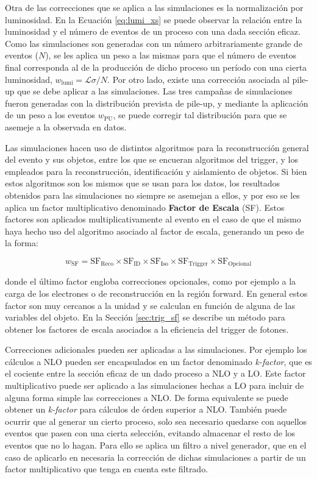 Otra de las correcciones que se aplica a las simulaciones es la normalización por luminosidad. En la Ecuación \ref{eq:lumi_xs} se puede observar la relación entre la luminosidad y el número de eventos de un proceso con una dada sección eficaz. Como las simulaciones son generadas con un número arbitrariamente grande de eventos ($N$), se les aplica un peso a las mismas para que el número de eventos final corresponda al de la producción de dicho proceso un período con una cierta luminosidad, $w_\text{lumi}=\mathcal{L}\sigma/N$. Por otro lado, existe una corrección asociada al pile-up que se debe aplicar a las simulaciones. Las tres campañas de simulaciones fueron generadas con la distribución prevista de pile-up, y mediante la aplicación de un peso a los eventos $w_\text{PU}$, se puede corregir tal distribución para que se asemeje a la observada en datos.

Las simulaciones hacen uso de distintos algoritmos para la reconstrucción general del evento y sus objetos, entre los que se encueran algoritmos del trigger, y los empleados para la reconstrucción, identificación y aislamiento de objetos. Si bien estos algoritmos son los mismos que se usan para los datos, los resultados obtenidos para las simulaciones no siempre se asemejan a ellos, y por eso se les aplica un factor multiplicativo denominado \textbf{Factor de Escala} (SF). Estos factores son aplicados multiplicativamente al evento en el caso de que el mismo haya hecho uso del algoritmo asociado al factor de escala, generando un peso de la forma: 

\begin{equation}
  w_{\text{SF}} = \text{SF}_\text{Reco} \times \text{SF}_\text{ID} \times  \text{SF}_\text{Iso} \times  \text{SF}_\text{Trigger} \times  \text{SF}_\text{Opcional}
\end{equation}

\noindent
donde el último factor engloba correcciones opcionales, como por ejemplo a la carga de los electrones o de reconstrucción en la región forward. En general estos factor son muy cercanos a la unidad y se calculan en función de alguna de las variables del objeto. En la Sección \ref{sec:trig_sf} se describe un método para obtener los factores de escala asociados a la eficiencia del trigger de fotones.

Correcciones adicionales pueden ser aplicadas a las simulaciones. Por ejemplo los cálculos a NLO pueden ser encapsulados en un factor denominado \textit{k-factor}, que es el cociente entre la sección eficaz de un dado proceso a NLO y a LO. Este factor multiplicativo puede ser aplicado a las simulaciones hechas a LO para incluir de alguna forma simple las correcciones a NLO. De forma equivalente se puede obtener un \textit{k-factor} para cálculos de órden superior a NLO. También  puede ocurrir que al generar un cierto proceso, solo sea necesario quedarse con aquellos eventos que pasen con una cierta selección, evitando almacenar el resto de los eventos que no lo hagan. Para ello se aplica un filtro a nivel generador, que en el caso de aplicarlo en necesaria la corrección de dichas simulaciones a partir de un factor multiplicativo que tenga en cuenta este filtrado.

